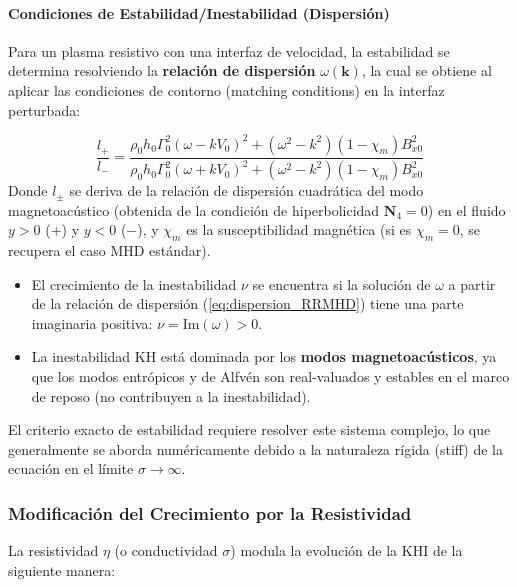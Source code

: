 \paragraph{Condiciones de Estabilidad/Inestabilidad (Dispersión)}
Para un plasma resistivo con una interfaz de velocidad, la estabilidad se determina resolviendo la \textbf{relación de dispersión} $\omega(\mathbf{k})$, la cual se obtiene al aplicar las condiciones de contorno (matching conditions) en la interfaz perturbada:

\begin{equation}
\frac{l_+}{l_-} = \frac{\rho_0 h_0 \Gamma_0^2 (\omega - k V_0)^2 + (\omega^2 - k^2)(1 - \chi_m) B_{x0}^2}{\rho_0 h_0 \Gamma_0^2 (\omega + k V_0)^2 + (\omega^2 - k^2)(1 - \chi_m) B_{x0}^2} \label{eq:dispersion_RRMHD}
\end{equation}
Donde $l_{\pm}$ se deriva de la relación de dispersión cuadrática del modo magnetoacústico (obtenida de la condición de hiperbolicidad $\mathbf{N}_4=0$) en el fluido $y>0$ ($+$) y $y<0$ ($-$), y $\chi_m$ es la susceptibilidad magnética (si es $\chi_m=0$, se recupera el caso MHD estándar).

\begin{itemize}
    \item El crecimiento de la inestabilidad $\nu$ se encuentra si la solución de $\omega$ a partir de la relación de dispersión (\ref{eq:dispersion_RRMHD}) tiene una parte imaginaria positiva: $\nu = \text{Im}(\omega) > 0$.
    \item La inestabilidad KH está dominada por los \textbf{modos magnetoacústicos}, ya que los modos entrópicos y de Alfvén son real-valuados y estables en el marco de reposo (no contribuyen a la inestabilidad).
\end{itemize}
El criterio exacto de estabilidad requiere resolver este sistema complejo, lo que generalmente se aborda numéricamente debido a la naturaleza rígida (stiff) de la ecuación en el límite $\sigma \to \infty$.

\subsubsection{Modificación del Crecimiento por la Resistividad}

La resistividad $\eta$ (o conductividad $\sigma$) modula la evolución de la KHI de la siguiente manera:

